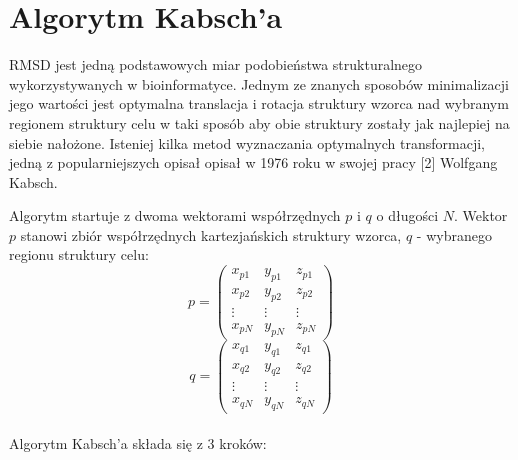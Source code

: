 \documentclass[licencjacka]{pracamgr}
\begin{document}
\section{Algorytm Kabsch'a}
RMSD jest jedną podstawowych miar podobieństwa strukturalnego wykorzystywanych w bioinformatyce. Jednym ze znanych sposobów minimalizacji jego wartości jest optymalna translacja i rotacja struktury wzorca nad wybranym regionem struktury celu w taki sposób aby obie struktury zostały jak najlepiej na siebie nałożone. Isteniej kilka metod wyznaczania optymalnych transformacji, jedną z popularniejszych opisał opisał w 1976 roku w swojej pracy [2] Wolfgang Kabsch.

Algorytm startuje z dwoma wektorami współrzędnych $p$ i $q$ o długości $N$. Wektor $p$ stanowi zbiór współrzędnych kartezjańskich struktury wzorca, $q$ - wybranego regionu struktury celu:
$$
p=
\begin{pmatrix}
 x_{p1} & y_{p1} & z_{p1} \\
 x_{p2} & y_{p2} & z_{p2} \\
 \vdots & \vdots & \vdots \\
 x_{pN} & y_{pN} & z_{pN}
\end{pmatrix}
$$
$$
q= 
\begin{pmatrix}
 x_{q1} & y_{q1} & z_{q1} \\
 x_{q2} & y_{q2} & z_{q2} \\
 \vdots & \vdots & \vdots \\
 x_{qN} & y_{qN} & z_{qN}
\end{pmatrix}
$$
\\
Algorytm Kabsch'a składa się z 3 kroków:
\end{document}
